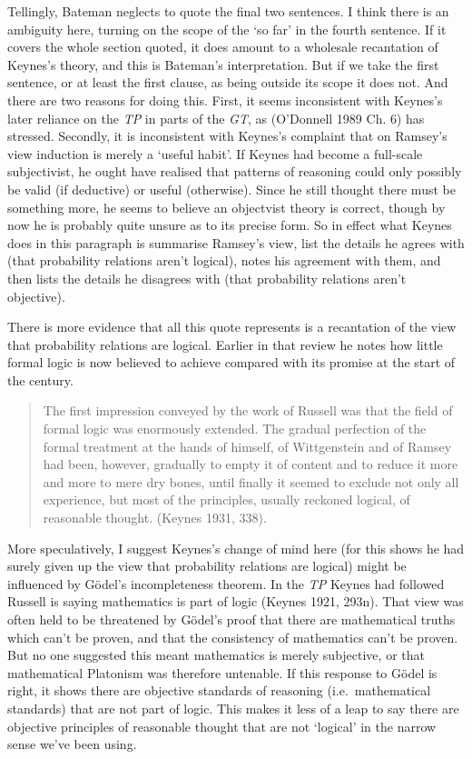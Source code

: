 \documentclass[noflushend]{philosophersimprint}
\begin{document}
Tellingly, Bateman neglects to quote the final two sentences. I think
there is an ambiguity here, turning on the scope of the `so far' in the
fourth sentence. If it covers the whole section quoted, it does amount
to a wholesale recantation of Keynes's theory, and this is Bateman's
interpretation. But if we take the first sentence, or at least the first
clause, as being outside its scope it does not. And there are two
reasons for doing this. First, it seems inconsistent with Keynes's later
reliance on the \emph{TP} in parts of the \emph{GT}, as (O'Donnell 1989
Ch. 6) has stressed. Secondly, it is inconsistent with Keynes's
complaint that on Ramsey's view induction is merely a `useful habit'. If
Keynes had become a full-scale subjectivist, he ought have realised that
patterns of reasoning could only possibly be valid (if deductive) or
useful (otherwise). Since he still thought there must be something more,
he seems to believe an objectvist theory is correct, though by now he is
probably quite unsure as to its precise form. So in effect what Keynes
does in this paragraph is summarise Ramsey's view, list the details he
agrees with (that probability relations aren't logical), notes his
agreement with them, and then lists the details he disagrees with (that
probability relations aren't objective).

There is more evidence that all this quote represents is a recantation
of the view that probability relations are logical. Earlier in that
review he notes how little formal logic is now believed to achieve
compared with its promise at the start of the century.

\begin{quote}
The first impression conveyed by the work of Russell was that the field
of formal logic was enormously extended. The gradual perfection of the
formal treatment at the hands of himself, of Wittgenstein and of Ramsey
had been, however, gradually to empty it of content and to reduce it
more and more to mere dry bones, until finally it seemed to exclude not
only all experience, but most of the principles, usually reckoned
logical, of reasonable thought. (Keynes 1931, 338).
\end{quote}

More speculatively, I suggest Keynes's change of mind here (for this
shows he had surely given up the view that probability relations are
logical) might be influenced by Gödel's incompleteness theorem. In the
\emph{TP} Keynes had followed Russell is saying mathematics is part of
logic (Keynes 1921, 293n). That view was often held to be threatened by
Gödel's proof that there are mathematical truths which can't be proven,
and that the consistency of mathematics can't be proven. But no one
suggested this meant mathematics is merely subjective, or that
mathematical Platonism was therefore untenable. If this response to
Gödel is right, it shows there are objective standards of reasoning
(i.e.~mathematical standards) that are not part of logic. This makes it
less of a leap to say there are objective principles of reasonable
thought that are not `logical' in the narrow sense we've been using.
\end{document}
